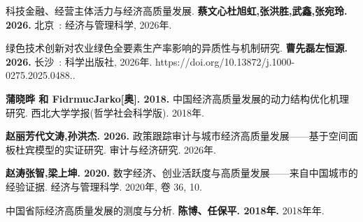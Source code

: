 \documentclass[UTF8,a4paper,12pt,fontset=windows]{ctexart}
\begin{document}
科技金融、经营主体活力与经济高质量发展. \textbf{蔡文心杜旭虹,张洪胜,武鑫,张宛玲. 2026.} 北京~: 经济与管理科学, 2026年.

绿色技术创新对农业绿色全要素生产率影响的异质性与机制研究. \textbf{曹先磊左恒源. 2026.} 长沙~: 科学出版社, 2026年. https://doi.org/10.13872/j.1000-0275.2025.0488..

\textbf{蒲晓晔 和 FidrmucJarko{[}奥{]}. 2018.} 中国经济高质量发展的动力结构优化机理研究. 西北大学学报(哲学社会科学版). 2018年.

\textbf{赵丽芳代文涛,孙洪杰. 2026.} 政策跟踪审计与城市经济高质量发展------基于空间面板杜宾模型的实证研究. 审计与经济研究. 2026年.

\textbf{赵涛张智,梁上坤. 2020.} 数字经济、创业活跃度与高质量发展------来自中国城市的经验证据. 经济与管理科学. 2020年, 卷 36, 10.

中国省际经济高质量发展的测度与分析. \textbf{陈博、任保平. 2018年.} 2018年年.
\end{document}
